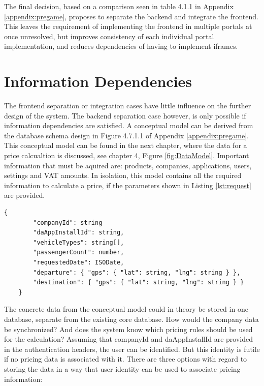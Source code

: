 The final decision, based on a comparison seen in table 4.1.1 in Appendix \ref{appendix:pregame}, proposes to separate the backend and integrate the frontend. This leaves the requirement of implementing the frontend in multiple portals at once unresolved, but improves consistency of each individual portal implementation, and reduces dependencies of having to implement iframes.

%
\section{Information Dependencies}
The frontend separation or integration cases have little influence on the further design of the system. The backend separation case however, is only possible if information dependencies are satisfied. A conceptual model can be derived from the database schema design in Figure 4.7.1.1 of Appendix \ref{appendix:pregame}. This conceptual model can be found in the next chapter, where the data for a price calcualtion is discussed, see chapter 4, Figure \ref{fig:DataModel}. Important information that must be aquired are: products, companies, applications, users, settings and VAT amounts. In isolation, this model contains all the required information to calculate a price, if the parameters shown in Listing \ref{lst:request} are provided.

\begin{lstlisting}[caption={Minimal external information required for a trip price calculation.}, label={lst:request}]
	{
		"companyId": string
		"daAppInstallId": string,
		"vehicleTypes": string[],
		"passengerCount": number,
		"requestedDate": ISODate,
		"departure": { "gps": { "lat": string, "lng": string } },
		"destination": { "gps": { "lat": string, "lng": string } }
	}
\end{lstlisting}

The concrete data from the conceptual model could in theory be stored in one database, separate from the existing core database. How would the company data be synchronized? And does the system know which pricing rules should be used for the calculation? Assuming that companyId and daAppInstallId are provided in the authentication headers, the user can be identified. But this identity is futile if no pricing data is associated with it. There are three options with regard to storing the data in a way that user identity can be used to associate pricing information:

